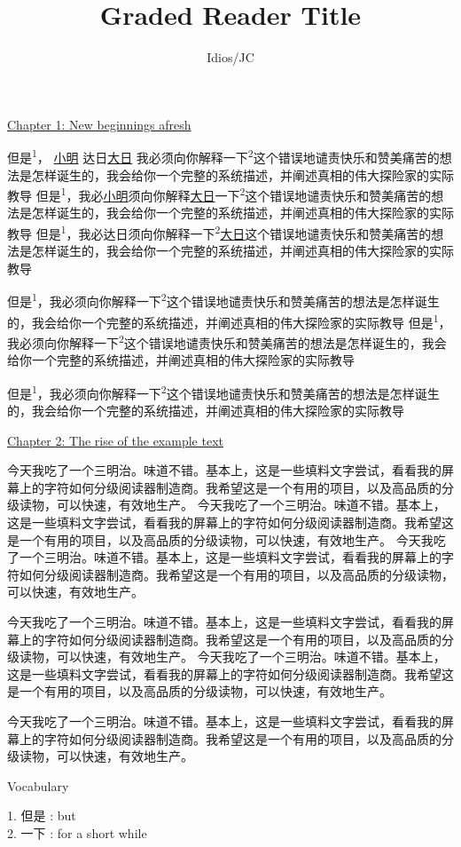 \documentclass{report}
\title{Graded Reader Title}
\author{Idios/JC}
\begin{document}
\maketitle
\clearpage
\clearpage
{\centering \large
{\uline{Chapter 1: New beginnings afresh}}\\}

但是\textsuperscript{1}， \uline{小明} 达日\uline{大日} 我必须向你解释一下\textsuperscript{2}这个错误地谴责快乐和赞美痛苦的想法是怎样诞生的，我会给你一个完整的系统描述，并阐述真相的伟大探险家的实际教导
但是\textsuperscript{1}，我必\uline{小明}须向你解释\uline{大日}一下\textsuperscript{2}这个错误地谴责快乐和赞美痛苦的想法是怎样诞生的，我会给你一个完整的系统描述，并阐述真相的伟大探险家的实际教导
但是\textsuperscript{1}，我必达日须向你解释一下\textsuperscript{2}\uline{大日}这个错误地谴责快乐和赞美痛苦的想法是怎样诞生的，我会给你一个完整的系统描述，并阐述真相的伟大探险家的实际教导

但是\textsuperscript{1}，我必须向你解释一下\textsuperscript{2}这个错误地谴责快乐和赞美痛苦的想法是怎样诞生的，我会给你一个完整的系统描述，并阐述真相的伟大探险家的实际教导
但是\textsuperscript{1}，我必须向你解释一下\textsuperscript{2}这个错误地谴责快乐和赞美痛苦的想法是怎样诞生的，我会给你一个完整的系统描述，并阐述真相的伟大探险家的实际教导

但是\textsuperscript{1}，我必须向你解释一下\textsuperscript{2}这个错误地谴责快乐和赞美痛苦的想法是怎样诞生的，我会给你一个完整的系统描述，并阐述真相的伟大探险家的实际教导

\clearpage
{\centering \large
{\uline{Chapter 2: The rise of the example text}}\\}

今天我吃了一个三明治。味道不错。基本上，这是一些填料文字尝试，看看我的屏幕上的字符如何分级阅读器制造商。我希望这是一个有用的项目，以及高品质的分级读物，可以快速，有效地生产。
今天我吃了一个三明治。味道不错。基本上，这是一些填料文字尝试，看看我的屏幕上的字符如何分级阅读器制造商。我希望这是一个有用的项目，以及高品质的分级读物，可以快速，有效地生产。
今天我吃了一个三明治。味道不错。基本上，这是一些填料文字尝试，看看我的屏幕上的字符如何分级阅读器制造商。我希望这是一个有用的项目，以及高品质的分级读物，可以快速，有效地生产。

今天我吃了一个三明治。味道不错。基本上，这是一些填料文字尝试，看看我的屏幕上的字符如何分级阅读器制造商。我希望这是一个有用的项目，以及高品质的分级读物，可以快速，有效地生产。
今天我吃了一个三明治。味道不错。基本上，这是一些填料文字尝试，看看我的屏幕上的字符如何分级阅读器制造商。我希望这是一个有用的项目，以及高品质的分级读物，可以快速，有效地生产。

今天我吃了一个三明治。味道不错。基本上，这是一些填料文字尝试，看看我的屏幕上的字符如何分级阅读器制造商。我希望这是一个有用的项目，以及高品质的分级读物，可以快速，有效地生产。
\clearpage
\setlength{\parindent}{0ex}
\centerline{Vocabulary}
1. 但是 : but\\
2. 一下 : for a short while\\
\end{document}
